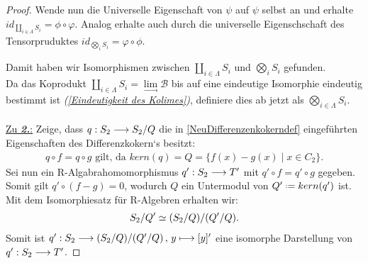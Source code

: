 \documentclass[10pt,a4paper]{report}
\newcommand{\functionfront}[3]{\nolinebreak{#1:#2 \longrightarrow #3}}
\newcommand{\function}[5]{\nolinebreak{#1:#2 \longrightarrow #3 \, , \, #4 \longmapsto #5}}
\newcommand{\colimes}[0]{\lim\limits_{ \longrightarrow }}
\newcommand*{\defeq}{\mathrel{\vcenter{\baselineskip0.5ex \lineskiplimit0pt
                     \hbox{\scriptsize.}\hbox{\scriptsize.}}}%
                     =}
\newcommand{\kernel}[1]{kern(#1)}
\begin{document}
\begin{proof}
Wende nun die Universelle Eigenschaft von $\psi$ auf $\psi$ selbst an und erhalte $id_{\coprod_{i \in \Lambda} S_i} = \phi \circ \varphi$. Analog erhalte auch durch die universelle Eigenschschaft des Tensorpruduktes $id_{\bigotimes_i S_i} = \varphi \circ \phi$.
\begin{center}
\end{center}
Damit haben wir Isomorphismen zwischen $\coprod_{i \in \Lambda} S_i$ und $\bigotimes_i S_i$ gefunden.\\
Da das Koprodukt $\coprod_{i \in \Lambda} S_i = \colimes \mathcal{B}$ bis auf eine eindeutige Isomorphie eindeutig bestimmt ist \textit{(\cref{Eindeutigkeit des Kolimes})}, definiere dies ab jetzt als $\bigotimes_{i \in \Lambda} S_i$.\\
\ \\
\underline{Zu \textit{\textbf{2.}}:} Zeige, dass $\functionfront{q}{S_2}{S_2/Q}$ die in \cref{NeuDifferenzenkokerndef} eingeführten Eigenschaften des Differenzkokern`s  besitzt:
\begin{gather*}
q \circ f = q \circ g \text{ gilt, da } \kernel{q} = Q = \lbrace f(x) - g(x)\mid x \in C_2 \rbrace.
\end{gather*}
Sei nun ein R-Algabrahomomorphismus $\functionfront{q'}{S_2}{T'}$ mit $q' \circ f = q' \circ g$ gegeben.\\
Somit gilt $q' \circ (f - g) = 0$, wodurch $Q$ ein Untermodul von $Q' \defeq \kernel{q'}$ ist.\\ Mit dem Isomorphiesatz für R-Algebren erhalten wir:
\begin{gather*}
 \nolinebreak{S_2/Q' \simeq (S_2/Q)/(Q'/Q)}.
\end{gather*}
Somit ist $\function{q'}{S_2}{(S_2/Q)/(Q'/Q)}{y}{[y]'}$ eine isomorphe Darstellung von $\functionfront{q'}{S_2}{T'}$.

\end{proof}
\end{document}
